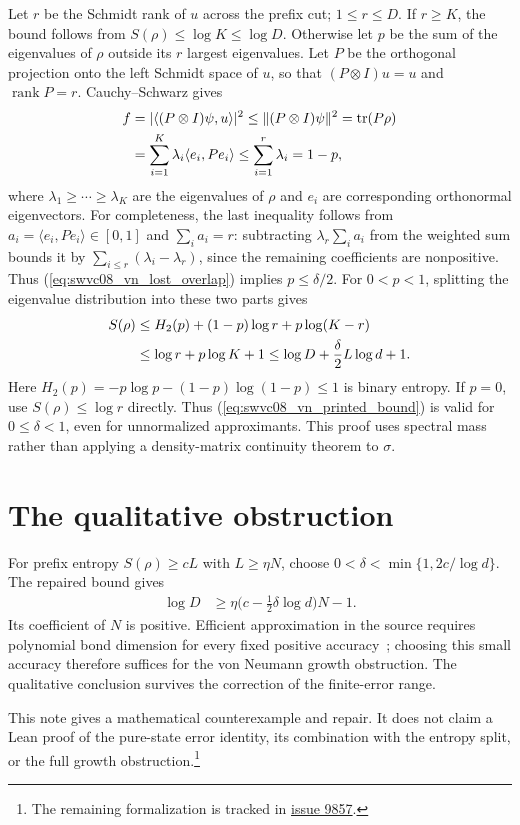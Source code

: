 \documentclass{article}
\begin{document}
Let $r$ be the Schmidt rank of $u$ across the prefix cut; $1\le r\le D$.
If $r\ge K$, the bound follows from $S(\rho)\le\log K\le\log D$.
Otherwise let $p$ be the sum of the eigenvalues of $\rho$ outside its
$r$ largest eigenvalues. Let $P$ be the orthogonal projection onto the
left Schmidt space of $u$, so that $(P\otimes I)u=u$ and
$\operatorname{rank}P=r$. Cauchy--Schwarz gives
\begin{align}
    f & =|\langle(P\otimes I)\psi,u\rangle|^2
    \le\lVert(P\otimes I)\psi\rVert^2
    =\operatorname{tr}(P\rho)\notag                   \\
      & =\sum_{i=1}^K\lambda_i\langle e_i,Pe_i\rangle
    \le\sum_{i=1}^r\lambda_i=1-p,
    \label{eq:swvc08_vn_schmidt_overlap}
\end{align}
where $\lambda_1\ge\cdots\ge\lambda_K$ are the eigenvalues of $\rho$
and $e_i$ are corresponding orthonormal eigenvectors. For completeness,
the last inequality follows from $a_i=\langle e_i,Pe_i\rangle\in[0,1]$
and $\sum_i a_i=r$: subtracting $\lambda_r\sum_i a_i$ from the weighted
sum bounds it by $\sum_{i\le r}(\lambda_i-\lambda_r)$, since the
remaining coefficients are nonpositive. Thus
(\ref{eq:swvc08_vn_lost_overlap}) implies $p\le\delta/2$.
For $0<p<1$, splitting the eigenvalue distribution into these two parts
gives
\begin{align}
    S(\rho)
     & \le H_2(p)+(1-p)\log r+p\log(K-r)\notag \\
     & \le\log r+p\log K+1
    \le\log D+\frac{\delta}{2}L\log d+1.
    \label{eq:swvc08_vn_entropy_split}
\end{align}
Here $H_2(p)=-p\log p-(1-p)\log(1-p)\le1$ is binary entropy.
If $p=0$, use $S(\rho)\le\log r$ directly. Thus
(\ref{eq:swvc08_vn_printed_bound}) is valid for $0\le\delta<1$, even
for unnormalized approximants. This proof uses spectral mass rather than
applying a density-matrix continuity theorem to $\sigma$.

\section{The qualitative obstruction}

For prefix entropy $S(\rho)\ge cL$ with $L\ge\eta N$, choose
$0<\delta<\min\{1,2c/\log d\}$. The repaired bound gives
\begin{align}
    \log D & \ge\eta\bigl(c-\tfrac12\delta\log d\bigr)N-1.
    \label{eq:swvc08_vn_growth}
\end{align}
Its coefficient of $N$ is positive. Efficient approximation in the
source requires polynomial bond dimension for every fixed positive
accuracy~\cite{Schuch2008EntropyScaling}; choosing this small accuracy
therefore suffices for the von Neumann growth obstruction.
The qualitative conclusion survives the correction of the finite-error range.

This note gives a mathematical counterexample and repair. It does not
claim a Lean proof of the pure-state error identity, its combination with
the entropy split, or the full growth obstruction.\footnote{The remaining
    formalization is tracked in
    \href{https://github.com/LionSR/TNLean/issues/9857}{issue 9857}.}



\end{document}

